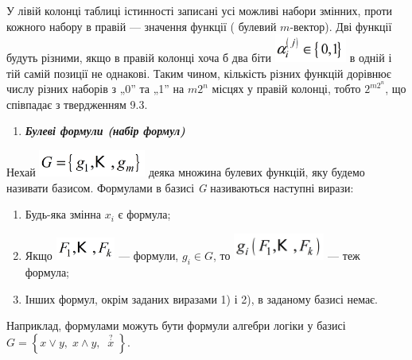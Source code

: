 \bigskip


\bigskip


\bigskip


\bigskip


\bigskip


\bigskip


\bigskip


\bigskip


\bigskip


\bigskip


\bigskip


\bigskip

У лівій колонці таблиці істинності записані усі можливі набори змінних, проти
кожного набору в правій --- значення функції ( булевий   $m${}-вектор). Дві
функції будуть різними, якщо в правій колонці хоча б два біти  
\includegraphics[width=0.9335in,height=0.3618in]{crypt-img/crypt-img102.png}  в
одній і тій самій позиції не однакові. Таким чином, кількість різних функцій
дорівнює числу різних наборів з „0” та „1”  на   $\mathit{m2}^n$ місцях у
правій колонці, тобто   $2^{\mathit{m2}^{n}}$, що співпадає з твердженням
 9.3.


\bigskip

\liststyleWWviiiNumlii
\setcounter{saveenum}{\value{enumi}}
\begin{enumerate}
\setcounter{enumi}{\value{saveenum}}
\item {\bfseries\itshape
Булеві формули (набір формул)}
\end{enumerate}
Нехай 
\includegraphics[width=1.3854in,height=0.3465in]{crypt-img/crypt-img103.png} 
деяка множина булевих функцій, яку будемо називати  базисом. Формулами в базисі
 \textit{G  }називаються наступні вирази:

\liststyleWWviiiNumv
\begin{enumerate}
\item Будь-яка змінна  $x_i$ є формула;
\item Якщо 
\includegraphics[width=0.7717in,height=0.2984in]{crypt-img/crypt-img104.png}  ---
формули,  $g_i\in G$, то 
\includegraphics[width=1.1811in,height=0.3465in]{crypt-img/crypt-img105.png}  ---
теж формула;
\item Інших формул, окрім заданих виразами 1) і 2), в заданому базисі немає.
\end{enumerate}
Наприклад, формулами  можуть бути формули алгебри логіки  у базисі  
$G=\left\{ x\vee y,\;x\wedge y,\;\;\overset{?}x\; \right\}$. 

